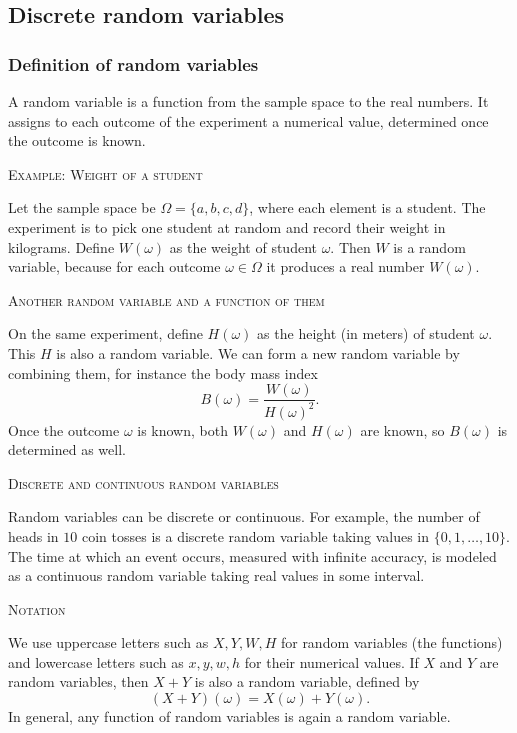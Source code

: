 \subsection{Discrete random variables}

\subsubsection{Definition of random variables}

A random variable is a function from the sample space to the real numbers.  
It assigns to each outcome of the experiment a numerical value, determined once the outcome is known.

\bigskip\textsc{Example: Weight of a student}

Let the sample space be \(\Omega = \{a,b,c,d\}\), where each element is a student.  
The experiment is to pick one student at random and record their weight in kilograms.  
Define \(W(\omega)\) as the weight of student \(\omega\).  
Then \(W\) is a random variable, because for each outcome \(\omega \in \Omega\) it produces a real number \(W(\omega)\).

\bigskip\textsc{Another random variable and a function of them}

On the same experiment, define \(H(\omega)\) as the height (in meters) of student \(\omega\).  
This \(H\) is also a random variable.  
We can form a new random variable by combining them, for instance the body mass index
\[
B(\omega) = \frac{W(\omega)}{H(\omega)^2}.
\]
Once the outcome \(\omega\) is known, both \(W(\omega)\) and \(H(\omega)\) are known, so \(B(\omega)\) is determined as well.

\bigskip\textsc{Discrete and continuous random variables}

Random variables can be discrete or continuous.  
For example, the number of heads in \(10\) coin tosses is a discrete random variable taking values in \(\{0,1,\dots,10\}\).  
The time at which an event occurs, measured with infinite accuracy, is modeled as a continuous random variable taking real values in some interval.

\bigskip\textsc{Notation}

We use uppercase letters such as \(X, Y, W, H\) for random variables (the functions) and lowercase letters such as \(x, y, w, h\) for their numerical values.  
If \(X\) and \(Y\) are random variables, then \(X+Y\) is also a random variable, defined by
\[
(X+Y)(\omega) = X(\omega) + Y(\omega).
\]
In general, any function of random variables is again a random variable.



